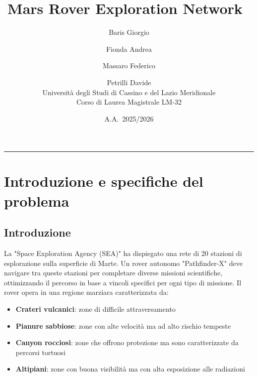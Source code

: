 \documentclass[11pt,a4paper]{article}
\title{
  \vspace{-1cm}
  {\Large \textbf{Mars Rover Exploration Network}}\
}
\author{Baris Giorgio \and Fionda Andrea \and Massaro Federico \and Petrilli Davide \\ [0.5cm]
  \small Università degli Studi di Cassino e del Lazio Meridionale\\
  \small Corso di Laurea Magistrale LM-32
}
\date{A.A.\ 2025/2026}
\begin{document}
\maketitle
\thispagestyle{fancy}
\tableofcontents
\vspace{0.4cm}
\rule{\linewidth}{0.3pt}
\bigskip

\section{Introduzione e specifiche del problema}
\subsection{Introduzione}
La "Space Exploration Agency (SEA)" ha dispiegato una rete di 20 stazioni di esplorazione sulla superficie di Marte. 
Un rover autonomo "Pathfinder-X" deve navigare tra queste stazioni per completare diverse missioni scientifiche, ottimizzando il percorso in base a vincoli specifici per ogni tipo di missione.
Il rover opera in una regione marziara caratterizzata da:
\begin{itemize}
  \item \textbf{Crateri vulcanici}: zone di difficile attraversamento
  \item \textbf{Pianure sabbiose}: zone con alte velocità ma ad alto rischio tempeste
  \item \textbf{Canyon rocciosi}:  zone che offrono protezione ma sono caratterizzate da percorsi tortuosi
  \item \textbf{Altipiani}: zone con buona visibilità ma con alta esposizione alle radiazioni
\end{itemize}
\end{document}
